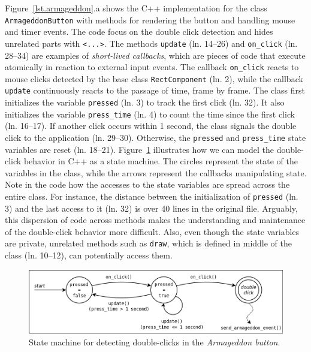 \documentclass{vgtc}                          %
\newcommand{\code}[1] {{\small{\texttt{#1}}}}
\begin{document}
Figure~\ref{lst.armageddon}.a shows the C++ implementation for the class
\code{ArmageddonButton} with methods for rendering the button and handling
mouse and timer events.
The code focus on the double click detection and hides unrelated parts with
\code{<...>}.
%
The methods \code{update} (ln. 14--26) and \code{on\_click} (ln. 28--34) are
examples of \emph{short-lived callbacks}, which are pieces of code that execute
atomically in reaction to external input events.
The callback \code{on\_click} reacts to mouse clicks detected by the base class
\code{RectComponent} (ln. 2), while the callback \code{update} continuously
reacts to the passage of time, frame by frame.
%
The class first initializes the variable \code{pressed} (ln. 3) to track the
first click (ln. 32).
It also initializes the variable \code{press\_time} (ln. 4) to count the time
since the first click (ln. 16--17).
If another click occurs within 1 second, the class signals the double click to
the application (ln. 29--30).
Otherwise, the \code{pressed} and \code{press\_time} state variables are reset
(ln. 18--21). 
%
Figure~\ref{fig.armageddon.fsm} illustrates how we can model the double-click 
behavior in C++ as a state machine.
The circles represent the state of the variables in the class, while the arrows 
represent the callbacks manipulating state.
%
Note in the code how the accesses to the state variables are spread
across the entire class.
For instance, the distance between the initialization of \code{pressed} (ln.
3) and the last access to it (ln. 32) is over 40 lines in the original file.
Arguably, this dispersion of code across methods makes the understanding and 
maintenance of the double-click behavior more difficult.
Also, even though the state variables are private, unrelated methods such as 
\code{draw}, which is defined in middle of the class (ln. 10--12), can
potentially access them.

\begin{figure}[t]
\centering
\includegraphics[width=\columnwidth]{double-click}
\caption{State machine for detecting double-clicks in the
         \emph{Armageddon button}.
\label{fig.armageddon.fsm}
}
\end{figure}
\end{document}
